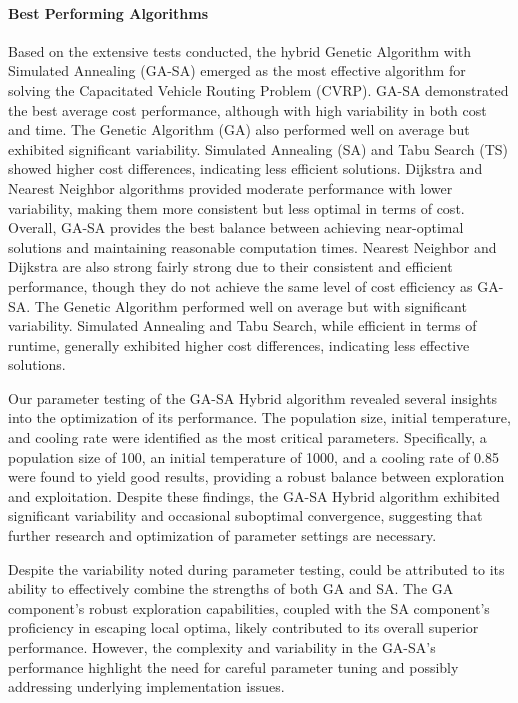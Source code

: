 \documentclass{article}
\begin{document}
    \paragraph{Best Performing Algorithms}
    Based on the extensive tests conducted, the hybrid Genetic Algorithm with Simulated Annealing (GA-SA) emerged as the most effective algorithm for solving the Capacitated Vehicle Routing Problem (CVRP). GA-SA demonstrated the best average cost performance, although with high variability in both cost and time. The Genetic Algorithm (GA) also performed well on average but exhibited significant variability. Simulated Annealing (SA) and Tabu Search (TS) showed higher cost differences, indicating less efficient solutions. Dijkstra and Nearest Neighbor algorithms provided moderate performance with lower variability, making them more consistent but less optimal in terms of cost. Overall, GA-SA provides the best balance between achieving near-optimal solutions and maintaining reasonable computation times. Nearest Neighbor and Dijkstra are also strong fairly strong due to their consistent and efficient performance, though they do not achieve the same level of cost efficiency as GA-SA. The Genetic Algorithm performed well on average but with significant variability. Simulated Annealing and Tabu Search, while efficient in terms of runtime, generally exhibited higher cost differences, indicating less effective solutions.

    Our parameter testing of the GA-SA Hybrid algorithm revealed several insights into the optimization of its performance. The population size, initial temperature, and cooling rate were identified as the most critical parameters. Specifically, a population size of 100, an initial temperature of 1000, and a cooling rate of 0.85 were found to yield good results, providing a robust balance between exploration and exploitation. Despite these findings, the GA-SA Hybrid algorithm exhibited significant variability and occasional suboptimal convergence, suggesting that further research and optimization of parameter settings are necessary.

    Despite the variability noted during parameter testing, could be attributed to its ability to effectively combine the strengths of both GA and SA. The GA component's robust exploration capabilities, coupled with the SA component's proficiency in escaping local optima, likely contributed to its overall superior performance. However, the complexity and variability in the GA-SA's performance highlight the need for careful parameter tuning and possibly addressing underlying implementation issues.
\end{document}
